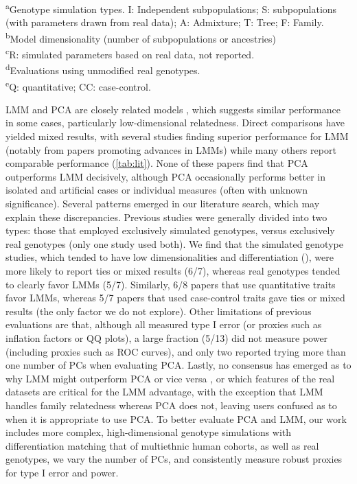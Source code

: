 \documentclass[11pt]{article}
\begin{document}
\begin{table}[b!]
\begin{tabular}{l|ccc|ccccc}
    \bottomrule
  \end{tabular}
  \begin{flushleft} 
    \textsuperscript{a}Genotype simulation types. I: Independent subpopulations; S: subpopulations (with parameters drawn from real data); A: Admixture; T: Tree; F: Family.\\
    \textsuperscript{b}Model dimensionality (number of subpopulations or ancestries)\\
    \textsuperscript{c}R: simulated parameters based on real data, \Fst not reported.\\
    \textsuperscript{d}Evaluations using unmodified real genotypes.\\
    \textsuperscript{e}Q: quantitative; CC: case-control.
  \end{flushleft}
\end{table}


LMM and PCA are closely related models \citep{astle_population_2009, hoffman_correcting_2013}, which suggests similar performance in some cases, particularly low-dimensional relatedness.
Direct comparisons have yielded mixed results, with several studies finding superior performance for LMM (notably from papers promoting advances in LMMs) while many others report comparable performance (\cref{tab:lit}).
None of these papers find that PCA outperforms LMM decisively, although PCA occasionally performs better in isolated and artificial cases or individual measures (often with unknown significance).
Several patterns emerged in our literature search, which may explain these discrepancies.
Previous studies were generally divided into two types: those that employed exclusively simulated genotypes, versus exclusively real genotypes (only one study used both).
We find that the simulated genotype studies, which tended to have low dimensionalities and differentiation (\Fst), were more likely to report ties or mixed results (6/7), whereas real genotypes tended to clearly favor LMMs (5/7).
Similarly, 6/8 papers that use quantitative traits favor LMMs, whereas 5/7 papers that used case-control traits gave ties or mixed results (the only factor we do not explore).
Other limitations of previous evaluations are that, although all measured type I error (or proxies such as inflation factors or QQ plots), a large fraction (5/13) did not measure power (including proxies such as ROC curves), and only two reported trying more than one number of PCs when evaluating PCA.
Lastly, no consensus has emerged as to why LMM might outperform PCA or vice versa \citep{price_new_2010, sul_mixed_2013, price_response_2013, hoffman_correcting_2013}, or which features of the real datasets are critical for the LMM advantage, with the exception that LMM handles family relatedness whereas PCA does not, leaving users confused as to when it is appropriate to use PCA.
To better evaluate PCA and LMM, our work includes more complex, high-dimensional genotype simulations with differentiation matching that of multiethnic human cohorts, as well as real genotypes, we vary the number of PCs, and consistently measure robust proxies for type I error and power.
\end{document}
